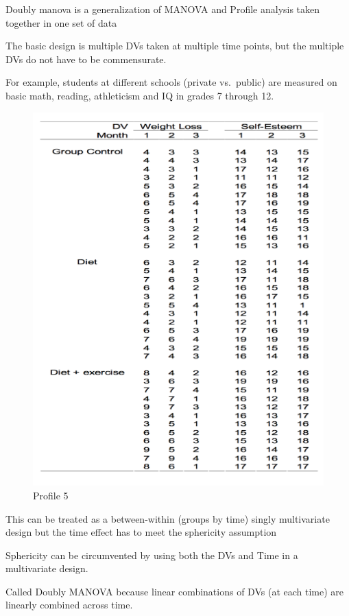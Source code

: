 \documentclass[]{book}
\theoremstyle{definition}
\theoremstyle{definition}
\theoremstyle{definition}
\theoremstyle{remark}
\begin{document}
Doubly manova is a generalization of MANOVA and Profile analysis taken
together in one set of data

The basic design is multiple DVs taken at multiple time points, but the
multiple DVs do not have to be commensurate.

For example, students at different schools (private vs.~public) are
measured on basic math, reading, athleticism and IQ in grades 7 through
12.

\begin{figure}
\centering
\includegraphics{img/jhprofile5.png}
\caption{Profile 5}
\end{figure}

This can be treated as a between-within (groups by time) singly
multivariate design but the time effect has to meet the sphericity
assumption

Sphericity can be circumvented by using both the DVs and Time in a
multivariate design.

Called Doubly MANOVA because linear combinations of DVs (at each time)
are linearly combined across time.
\end{document}
